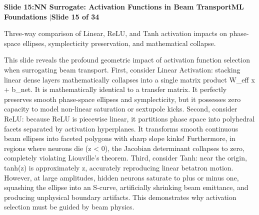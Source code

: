 \documentclass[11pt,a4paper]{article}
\begin{document}
\noindent\begin{tcolorbox}[colback=navy,colframe=navy,left=6pt,right=6pt,top=3pt,bottom=3pt,boxrule=0pt,arc=2pt]
{\large\bfseries\color{white}Slide 15:\enspace NN Surrogate: Activation Functions in Beam Transport}\hfill{\footnotesize\bfseries\color{white!85!lightbg}ML Foundations \enspace$|$\enspace Slide 15 of 34}
\end{tcolorbox}
\vspace{0.2em}
\begin{tcolorbox}[colback=lightbg,colframe=bordergray,title={\footnotesize\bfseries\color{darkgray}Slide Visual Blueprint},fontupper=\small,left=6pt,right=6pt,top=2.5pt,bottom=2.5pt,boxrule=0.6pt,arc=2.5pt]
Three-way comparison of Linear, ReLU, and Tanh activation impacts on phase-space ellipses, symplecticity preservation, and mathematical collapse.
\end{tcolorbox}
\vspace{0.2em}
\begin{tcolorbox}[colback=white,colframe=primaryblue,title={\footnotesize\bfseries\color{white}Spoken Presenter Script},fontupper=\small,left=6pt,right=6pt,top=3pt,bottom=3pt,boxrule=0.8pt,arc=2.5pt]
This slide reveals the profound geometric impact of activation function selection when surrogating beam transport. First, consider Linear Activation: stacking linear dense layers mathematically collapses into a single matrix product W\_eff x + b\_net. It is mathematically identical to a transfer matrix. It perfectly preserves smooth phase-space ellipses and symplecticity, but it possesses zero capacity to model non-linear saturation or sextupole kicks. Second, consider ReLU: because ReLU is piecewise linear, it partitions phase space into polyhedral facets separated by activation hyperplanes. It transforms smooth continuous beam ellipses into faceted polygons with sharp slope kinks! Furthermore, in regions where neurons die (z < 0), the Jacobian determinant collapses to zero, completely violating Liouville's theorem. Third, consider Tanh: near the origin, tanh(z) is approximately z, accurately reproducing linear betatron motion. However, at large amplitudes, hidden neurons saturate to plus or minus one, squashing the ellipse into an S-curve, artificially shrinking beam emittance, and producing unphysical boundary artifacts. This demonstrates why activation selection must be guided by beam physics.
\end{tcolorbox}
\vspace{0.2em}
\end{document}
